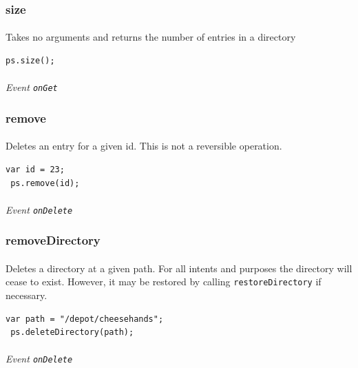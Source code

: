 \documentclass{report}
\begin{document}
\subsubsection{size}
\paragraph{}
Takes no arguments and returns the number of entries in a directory
\begin{Verbatim}[frame=single]
 ps.size(); 
\end{Verbatim}

\paragraph{}
\textit{Event \texttt{onGet}}

\subsubsection{remove}
\paragraph{}
Deletes an entry for a given id. This is not a reversible operation.
\begin{Verbatim}[frame=single]
 var id = 23;
 ps.remove(id);
\end{Verbatim}

\paragraph{}
\textit{Event \texttt{onDelete}}

\subsubsection{removeDirectory}
\paragraph{}
Deletes a directory at a given path. For all intents and purposes the
directory will cease to exist. However, it may be restored by calling
\texttt{restoreDirectory} if necessary.
\begin{Verbatim}[frame=single]
 var path = "/depot/cheesehands";
 ps.deleteDirectory(path);
\end{Verbatim}
\paragraph{}
\textit{Event \texttt{onDelete}}
\end{document}
